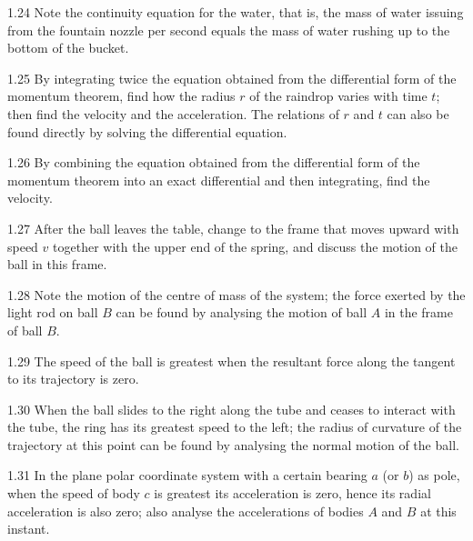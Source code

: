 \begin{hint}{1.24}
Note the continuity equation for the water, that is, the mass of water issuing from the fountain nozzle per second equals the mass of water rushing up to the bottom of the bucket.
\end{hint}

\begin{hint}{1.25}
By integrating twice the equation obtained from the differential form of the momentum theorem, find how the radius $r$ of the raindrop varies with time $t$; then find the velocity and the acceleration. The relations of $r$ and $t$ can also be found directly by solving the differential equation.
\end{hint}

\begin{hint}{1.26}
By combining the equation obtained from the differential form of the momentum theorem into an exact differential and then integrating, find the velocity.
\end{hint}

\begin{hint}{1.27}
After the ball leaves the table, change to the frame that moves upward with speed $v$ together with the upper end of the spring, and discuss the motion of the ball in this frame.
\end{hint}

\begin{hint}{1.28}
Note the motion of the centre of mass of the system; the force exerted by the light rod on ball $B$ can be found by analysing the motion of ball $A$ in the frame of ball $B$.
\end{hint}

\begin{hint}{1.29}
The speed of the ball is greatest when the resultant force along the tangent to its trajectory is zero.
\end{hint}

\begin{hint}{1.30}
When the ball slides to the right along the tube and ceases to interact with the tube, the ring has its greatest speed to the left; the radius of curvature of the trajectory at this point can be found by analysing the normal motion of the ball.
\end{hint}

\begin{hint}{1.31}
In the plane polar coordinate system with a certain bearing $a$ (or $b$) as pole, when the speed of body $c$ is greatest its acceleration is zero, hence its radial acceleration is also zero; also analyse the accelerations of bodies $A$ and $B$ at this instant.
\end{hint}

